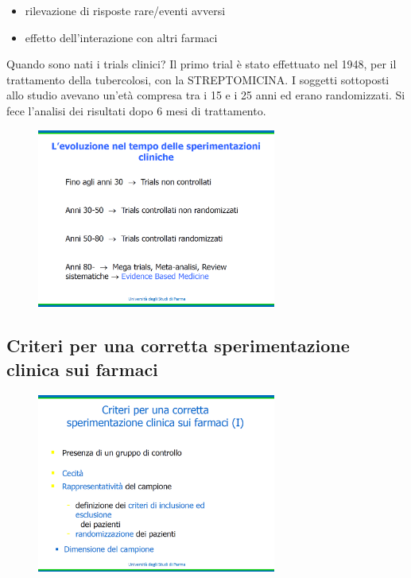 \begin{itemize}
\item
  rilevazione di risposte rare/eventi avversi
\item
  effetto dell'interazione con altri farmaci
\end{itemize}

Quando sono nati i trials clinici? Il primo trial è stato effettuato nel
1948, per il trattamento della tubercolosi, con la STREPTOMICINA. I
soggetti sottoposti allo studio avevano un'età compresa tra i 15 e i 25
anni ed erano randomizzati. Si fece l'analisi dei risultati dopo 6 mesi
di trattamento.

\begin{figure}[!ht]
\centering
\includegraphics[width=0.7\textwidth]{05/image11.png}
\end{figure}

\subsection{Criteri per una corretta sperimentazione clinica sui farmaci}

\begin{figure}[!ht]
\centering
\includegraphics[width=0.7\textwidth]{05/image12.png}
\end{figure}

